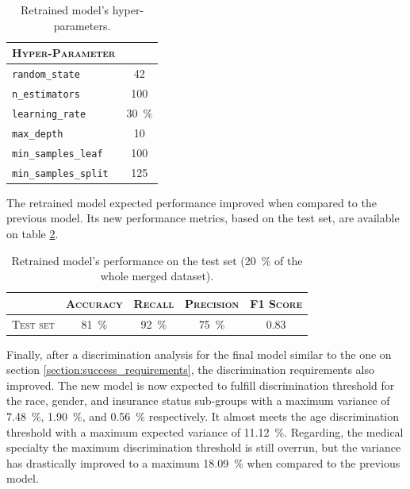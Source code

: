 \documentclass[a4paper,11pt]{article}
\begin{document}
\begin{table}[htb]
\caption{Retrained model's hyper-parameters.}
\label{tab:new_model_hyperparameters}
\centering
\begin{tabularx}{0.5\textwidth}{Xc}
\toprule
\textsc{Hyper-Parameter} &  \\
\midrule
\texttt{random\_state} & \SI{42}{} \\
\texttt{n\_estimators} & \SI{100}{} \\
\texttt{learning\_rate} & \SI{30}{\percent} \\
\texttt{max\_depth} & \SI{10}{} \\
\texttt{min\_samples\_leaf} & \SI{100}{} \\
\texttt{min\_samples\_split} & \SI{125}{} \\
\bottomrule
\end{tabularx}
\end{table}

The retrained model expected performance improved when compared to the previous model. Its new performance metrics, based on the test set, are available on table \ref{tab:new_model_performance}.

\begin{table}[htb]
\caption{Retrained model's performance on the test set (\SI{20}{\percent} of the whole merged dataset).}
\label{tab:new_model_performance}
\centering
\begin{tabularx}{0.75\textwidth}{Xcccc}
\toprule
           & \textsc{Accuracy} & \textsc{Recall} & \textsc{Precision} & \textsc{F1 Score} \\
\midrule
\textsc{Test set}   & \SI{81}{\percent} & \SI{92}{\percent} & \SI{75}{\percent}        & \SI{0.83}{}     \\
\bottomrule
\end{tabularx}
\end{table}

Finally, after a discrimination analysis for the final model similar to the one on section \ref{section:success_requirements}, the discrimination requirements also improved. The new model is now expected to fulfill discrimination threshold for the race, gender, and insurance status sub-groups with a maximum variance of \SI{7.48}{\percent},  \SI{1.90}{\percent}, and  \SI{0.56}{\percent} respectively. It almost meets the age discrimination threshold with a maximum expected variance of \SI{11,12}{\percent}.
Regarding, the medical specialty the maximum discrimination threshold is still overrun, but the variance has drastically improved to a maximum \SI{18.09}{\percent} when compared to the previous model.
\end{document}
